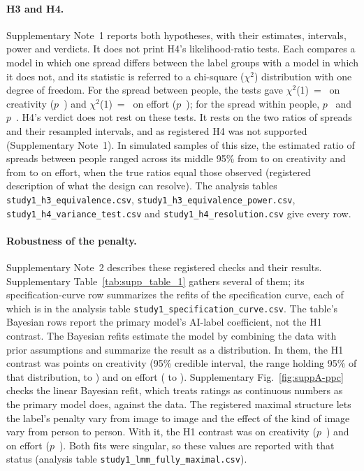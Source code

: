 \paragraph*{H3 and H4.}
Supplementary Note~1 reports both hypotheses, with their estimates, intervals, power and verdicts. It does not print H4's likelihood-ratio tests. Each compares a model in which one spread differs between the label groups with a model in which it does not, and its statistic is referred to a chi-square ($\chi^2$) distribution with one degree of freedom. For the spread between people, the tests gave $\chi^2$(1)~=~\SOneHFourCreatChisq{} on creativity ($p$~\SOneHFourCreatP) and $\chi^2$(1)~=~\SOneHFourEffChisq{} on effort ($p$~\SOneHFourEffP); for the spread within people, $p$~\SOneHFourCreatResidualP{} and $p$~\SOneHFourEffResidualP. H4's verdict does not rest on these tests. It rests on the two ratios of spreads and their resampled intervals, and as registered H4 was not supported (Supplementary Note~1). In simulated samples of this size, the estimated ratio of spreads between people ranged across its middle 95\% from \SOneHFourCreatResolutionRatioLo{} to \SOneHFourCreatResolutionRatioHi{} on creativity and from \SOneHFourEffResolutionRatioLo{} to \SOneHFourEffResolutionRatioHi{} on effort, when the true ratios equal those observed (registered description of what the design can resolve). The analysis tables \nolinkurl{study1_h3_equivalence.csv}, \nolinkurl{study1_h3_equivalence_power.csv}, \nolinkurl{study1_h4_variance_test.csv} and \nolinkurl{study1_h4_resolution.csv} give every row.

\paragraph*{Robustness of the penalty.}
Supplementary Note~2 describes these registered checks and their results. Supplementary Table~\ref{tab:supp_table_1} gathers several of them; its specification-curve row summarizes the \SOneSpecNTotal{} refits of the specification curve, each of which is in the analysis table \nolinkurl{study1_specification_curve.csv}. The table's Bayesian rows report the primary model's AI-label coefficient, not the H1 contrast. The Bayesian refits estimate the model by combining the data with prior assumptions and summarize the result as a distribution. In them, the H1 contrast was \SOneBayesCreat{} points on creativity (95\% credible interval, the range holding 95\% of that distribution, \SOneBayesCreatLo{} to \SOneBayesCreatHi) and \SOneBayesEff{} on effort (\SOneBayesEffLo{} to \SOneBayesEffHi). Supplementary Fig.~\ref{fig:suppA-ppc} checks the linear Bayesian refit, which treats ratings as continuous numbers as the primary model does, against the data. The registered maximal structure lets the label's penalty vary from image to image and the effect of the kind of image vary from person to person. With it, the H1 contrast was \SOneMaximalCreatEst{} on creativity ($p$~\SOneMaximalCreatP) and \SOneMaximalEffEst{} on effort ($p$~\SOneMaximalEffP). Both fits were singular, so these values are reported with that status (analysis table \nolinkurl{study1_lmm_fully_maximal.csv}).

